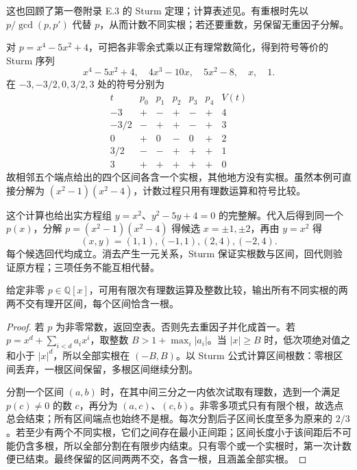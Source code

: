 这也回顾了第一卷附录 E.3 的 Sturm 定理；计算表述见\cite[Section 1.3, Theorem 1.4]{Sturmfels2002PolynomialEquations}。有重根时先以 \(p/\gcd(p,p')\) 代替 \(p\)，从而计数不同实根；若还要重数，另保留无重因子分解。

\begin{example}\label{b3:exm:sturm-quartic-isolation}\label{b3:exm:G-eliminate-and-isolate}
	对 \(p=x^4-5x^2+4\)，可把各非零余式乘以正有理常数简化，得到符号等价的 Sturm 序列
	\[
		x^4-5x^2+4,\quad4x^3-10x,\quad5x^2-8,\quad x,\quad1.
	\]
	在 \(-3,-3/2,0,3/2,3\) 处的符号分别为
	\[
		\begin{array}{c|ccccc|c}
			t&p_0&p_1&p_2&p_3&p_4&V(t)\\\hline -3&+&-&+&-&+&4\\
			-3/2&-&+&+&-&+&3\\
			0&+&0&-&0&+&2\\
			3/2&-&-&+&+&+&1\\
			3&+&+&+&+&+&0
		\end{array}
	\]
	故相邻五个端点给出的四个区间各含一个实根，其他地方没有实根。虽然本例可直接分解为 \((x^2-1)(x^2-4)\)，计数过程只用有理数运算和符号比较。

	这个计算也给出实方程组 \(y=x^2\)、\(y^2-5y+4=0\) 的完整解。代入后得到同一个 \(p(x)\)，分解 \(p=(x^2-1)(x^2-4)\) 得候选 \(x=\pm1,\pm2\)，再由 \(y=x^2\) 得
	\[
		(x,y)=(1,1),(-1,1),(2,4),(-2,4).
	\]
	每个候选回代均成立。消去产生一元关系，Sturm 保证实根数与区间，回代则验证原方程；三项任务不能互相代替。
\end{example}

\begin{proposition}[有理系数实根隔离]\label{b3:prop:rational-real-root-isolation}
	给定非零 \(p\in\mathbb Q[x]\)，可用有限次有理数运算及整数比较，输出所有不同实根的两两不交有理开区间，每个区间恰含一根。
\end{proposition}
\begin{proof}
	若 \(p\) 为非零常数，返回空表。否则先去重因子并化成首一。若 \(p=x^d+\sum_{i<d}a_ix^i\)，取整数 \(B>1+\max_i|a_i|\)。当 \(|x|\ge B\) 时，低次项绝对值之和小于 \(|x|^d\)，所以全部实根在 \((-B,B)\)。以 Sturm 公式计算区间根数：零根区间丢弃，一根区间保留，多根区间继续分割。

	分割一个区间 \((a,b)\) 时，在其中间三分之一内依次试取有理数，选到一个满足 \(p(c)\ne0\) 的数 \(c\)，再分为 \((a,c)\)、\((c,b)\)。非零多项式只有有限个根，故选点总会结束；所有区间端点也始终不是根。每次分割后子区间长度至多为原来的 \(2/3\)。若至少有两个不同实根，它们之间存在最小正间距；区间长度小于该间距后不可能仍含多根，所以全部分割在有限步内结束。只有零个或一个实根时，第一次计数便已结束。最终保留的区间两两不交，各含一根，且涵盖全部实根。
\end{proof}


